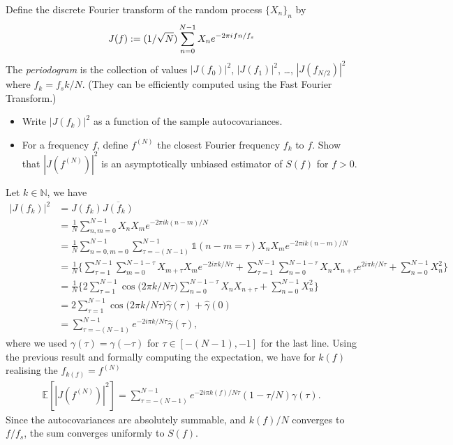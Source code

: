 \documentclass[11pt]{article}
\begin{document}
\begin{exercise}
Define the discrete Fourier transform of the random process $\{X_n\}_n$ by
\begin{equation}
    J(f) := (1/\sqrt{N})\sum_{n=0}^{N-1} X_n e^{-2\pi{i\mkern1mu} f n/f_s}
\end{equation}
The \textit{periodogram} is the collection of values $|J(f_0)|^2$, $|J(f_1)|^2$, \dots, $|J(f_{N/2})|^2$ where $f_k = f_s k/N$.
(They can be efficiently computed using the Fast Fourier Transform.)
\begin{itemize}
    \item Write $|J(f_k)|^2$ as a function of the sample autocovariances.
    \item For a frequency $f$, define $f^{(N)}$ the closest Fourier frequency $f_k$ to $f$.
    Show that $|J(f^{(N)})|^2$ is an asymptotically unbiased estimator of $S(f)$ for $f>0$.
\end{itemize}
\end{exercise}

\begin{solution}
Let $k \in \mathbb{N}$, we have
    \begin{equation}
        \begin{split}
            |J(f_k)|^2 &= J(f_k)\overline{J(f_k)}\\
            &= \frac{1}{N}\sum_{n, m = 0}^{N-1} X_n X_m e^{-2\pi i k(n-m)/N}\\
            & = \frac{1}{N}\sum_{n=0,m=0}^{N-1}\sum_{\tau=-(N-1)}^{N-1} \mathds{1}(n-m=\tau) X_n X_m e^{-2\pi i k(n-m)/N}\\
            &= \frac{1}{N}\bigg\{\sum_{\tau=1}^{N-1}\sum_{m=0}^{N-1-\tau}X_{m+\tau}X_m e^{-2i\pi k /N \tau}+\sum_{\tau=1}^{N-1}\sum_{n=0}^{N-1-\tau}X_n X_{n+\tau}e^{2i\pi k/N \tau} + \sum_{n=0}^{N-1} X_n^2\bigg\}\\
            &= \frac{1}{N}\bigg\{2\sum_{\tau=1}^{N-1}\cos{\big(2\pi k / N \tau\big)}\sum_{n=0}^{N-1-\tau}X_nX_{n+\tau}+\sum_{n=0}^{N-1}X_n^2\bigg\}\\
            &= 2\sum_{\tau=1}^{N-1}\cos{\big(2\pi k / N \tau\big)}\hat{\gamma}(\tau) + \hat{\gamma}(0)\\
            &= \sum_{\tau=-(N-1)}^{N-1}e^{-2i\pi k / N \tau}\hat{\gamma}(\tau),
        \end{split}
    \end{equation}
    where we used $\gamma(\tau) = \gamma(-\tau)$ for $\tau \in [-(N-1), -1]$ for the last line.
    Using the previous result and formally computing the expectation, we have for $k(f)$ realising the $f_{k(f)} = f^{(N)}$
    \begin{equation}
        \begin{split}
            \mathbb{E}[|J(f^{(N)})|^2] = \sum_{\tau=-(N-1)}^{N-1}e^{-2i\pi k(f) /N \tau}(1-\tau/N)\gamma(\tau).
        \end{split}
    \end{equation}
    Since the autocovariances are absolutely summable, and $k(f)/N$ converges to $f/f_s$, the sum converges uniformly to $S(f)$.
\end{solution}
\end{document}
